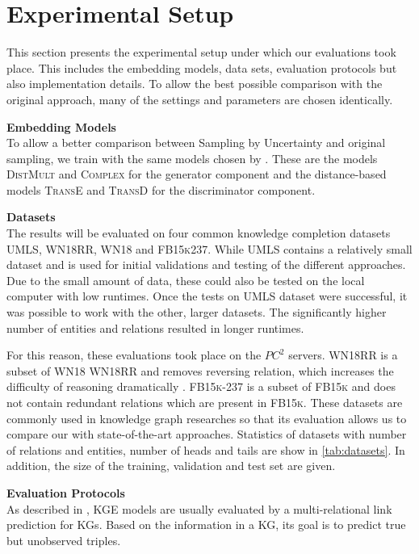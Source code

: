 \section{Experimental Setup}
\label{ch:evaluation:sec:experimental_setup}

This section presents the experimental setup under which our evaluations took place.
This includes the embedding models, data sets, evaluation protocols but also implementation details.
To allow the best possible comparison with the original \kbgan approach, many of the settings and parameters are chosen identically.

\textbf{Embedding Models}\\
To allow a better comparison between Sampling by Uncertainty and original sampling, we train with the same models chosen by \kbgan.
These are the models \textsc{DistMult} and \textsc{Complex} for the generator component and the distance-based models \textsc{TransE} and \textsc{TransD} for the discriminator component.

\textbf{Datasets}\\
The results will be evaluated on four common knowledge completion datasets  \textsc{UMLS}, \textsc{WN18RR}, \textsc{WN18} 
and \textsc{FB15k237}.
While \textsc{UMLS} contains a relatively small dataset and is used for initial validations and testing of the different approaches.
Due to the small amount of data, these could also be tested on the local computer with low runtimes.
Once the tests on \textsc{UMLS} dataset were successful, it was possible to work with the other, larger datasets.
The significantly higher number of entities and relations resulted in longer runtimes.

For this reason, these evaluations took place on the $PC^2$ servers.
\textsc{WN18RR} is a subset of \textsc{WN18} \textsc{WN18RR} and removes reversing relation, which increases the difficulty of reasoning dramatically \cite{cai2017kbgan}.
\textsc{FB15k-237} is a subset of \textsc{FB15k} and does not contain redundant relations which are present in \textsc{FB15k}.
These datasets are commonly used in knowledge graph researches so that its evaluation allows us to compare our with state-of-the-art approaches.
Statistics of datasets with number of relations and entities, number of heads and tails are show in \autoref{tab:datasets}. 
In addition, the size of the training, validation and test set are given.
        
\textbf{Evaluation Protocols}\\
As described in \cite{Ruffinelli2020You},
\ac{KGE} models are usually evaluated by a multi-relational link prediction for \acp{KG}.
Based on the information in a \ac{KG}, its goal is to predict true but unobserved triples.

